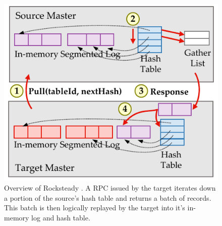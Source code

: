 \begin{figure}[t]
\centering
\includegraphics[width=0.70\columnwidth]{figures/rocksteady-overview.pdf}
\caption{Overview of Rocksteady \pulls. A \pull RPC issued by the target
    iterates down a portion of the source's hash table and returns a
    batch of records. This batch is then logically replayed by the
    target into it's in-memory log and hash table.}
\label{fig:migration-overview}
\end{figure}
